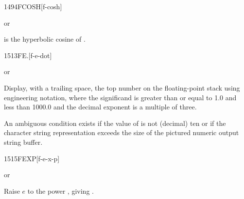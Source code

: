 \begin{worddef}{1494}{FCOSH}[f-cosh]
\item {} or

	 is the hyperbolic cosine of .
\end{worddef}

\enlargethispage{4ex}
\begin{worddef}[FEd]{1513}{FE.{}}[f-e-dot]
\item \stack{}{}  or

	Display, with a trailing space, the top number on the
	floating-point stack using engineering notation, where the
	significand is greater than or equal to 1.0 and less than
	1000.0 and the decimal exponent is a multiple of three.

	An ambiguous condition exists if the value of 
	is not (decimal) ten or if the character string representation
	exceeds the size of the pictured numeric output string buffer.

\end{worddef}


\begin{worddef}{1515}{FEXP}[f-e-x-p]
\item {} or

	Raise $e$ to the power , giving .
\end{worddef}

